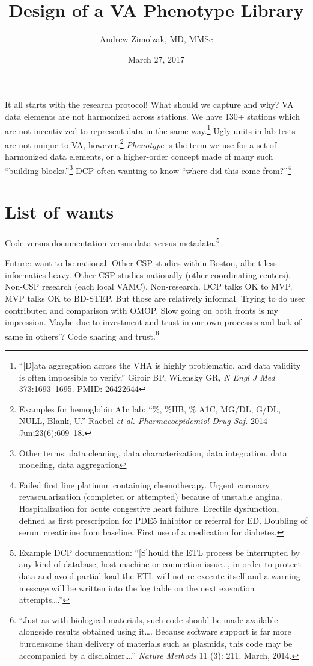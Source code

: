 \documentclass{tufte-handout}
\title{Design of a VA Phenotype Library}
\author{Andrew Zimolzak, MD, MMSc}
\date{March 27, 2017}
\begin{document}
\maketitle

It all starts with the research protocol! What should we capture and
why? VA data elements are not harmonized across stations. We have 130+
stations which are not incentivized to represent data in the same
way.\footnote{``[D]ata aggregation across the VHA is highly problematic,
  and data validity is often impossible to verify.'' Giroir BP,
  Wilensky GR, \emph{N Engl J Med} 373:1693--1695. PMID: 26422644}
Ugly units in lab tests are not unique to VA,
however.\footnote{Examples for hemoglobin A1c lab: ``\%, \%HB, \% A1C,
  MG/DL, G/DL, NULL, Blank, U.'' Raebel \emph{et al. Pharmacoepidemiol
    Drug Saf.} 2014 Jun;23(6):609--18.} \emph{Phenotype} is the term
we use for a set of harmonized data elements, or a higher-order
concept made of many such ``building blocks.''\footnote{Other terms:
  data cleaning, data characterization, data integration, data
  modeling, data aggregation} DCP often wanting to know ``where did
this come from?''\footnote{Failed first line platinum containing
  chemotherapy. Urgent coronary revascularization (completed or
  attempted) because of unstable angina. Hospitalization for acute
  congestive heart failure. Erectile dysfunction, defined as first
  prescription for PDE5 inhibitor or referral for ED. Doubling of
  serum creatinine from baseline. First use of a medication for
  diabetes.}

\section{List of wants}

Code versus documentation versus data versus
metadata.\footnote{Example DCP documentation: ``[S]hould the ETL
  process be interrupted by any kind of database, host machine or
  connection issue\ldots{}, in order to protect data and avoid partial
  load the ETL will not re-execute itself and a warning message will
  be written into the log table on the next execution
  attempts\ldots{}.''}

Future: want to be national. Other CSP studies within Boston, albeit
less informatics heavy. Other CSP studies nationally (other
coordinating centers). Non-CSP research (each local VAMC).
Non-research. DCP talks OK to MVP. MVP talks OK to BD-STEP. But those
are relatively informal. Trying to do user contributed and comparison
with OMOP. Slow going on both fronts is my impression. Maybe due to
investment and trust in our own processes and lack of same in others'?
Code sharing and trust.\footnote{``Just as with biological materials,
  such code should be made available alongside results obtained using
  it\ldots{}. Because software support is far more burdensome than
  delivery of materials such as plasmids, this code may be accompanied
  by a disclaimer\ldots{}.'' \emph{Nature Methods} 11 (3): 211. March,
  2014.}
\end{document}
